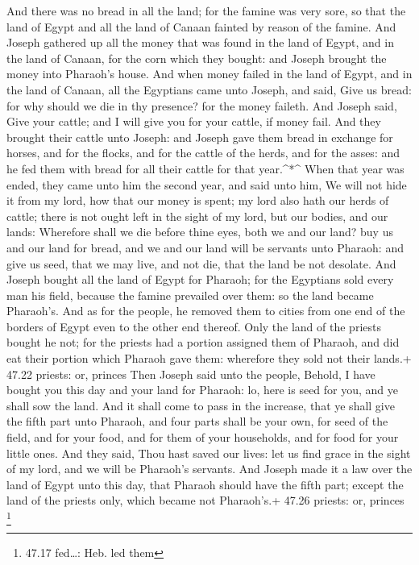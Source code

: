  And there was no bread in all the land; for the famine was
very sore, so that the land of Egypt and all the land of Canaan fainted
by reason of the famine.  And Joseph gathered up all the
money that was found in the land of Egypt, and in the land of Canaan,
for the corn which they bought: and Joseph brought the money into
Pharaoh's house.  And when money failed in the land of
Egypt, and in the land of Canaan, all the Egyptians came unto Joseph,
and said, Give us bread: for why should we die in thy presence? for the
money faileth.  And Joseph said, Give your cattle; and I
will give you for your cattle, if money fail.  And they
brought their cattle unto Joseph: and Joseph gave them bread in exchange
for horses, and for the flocks, and for the cattle of the herds, and for
the asses: and he fed them with bread for all their cattle for that
year.\^{}*\^{}  When that year was ended, they came unto
him the second year, and said unto him, We will not hide it from my
lord, how that our money is spent; my lord also hath our herds of
cattle; there is not ought left in the sight of my lord, but our bodies,
and our lands:  Wherefore shall we die before thine eyes,
both we and our land? buy us and our land for bread, and we and our land
will be servants unto Pharaoh: and give us seed, that we may live, and
not die, that the land be not desolate.  And Joseph bought
all the land of Egypt for Pharaoh; for the Egyptians sold every man his
field, because the famine prevailed over them: so the land became
Pharaoh's.  And as for the people, he removed them to
cities from one end of the borders of Egypt even to the other end
thereof.  Only the land of the priests bought he not; for
the priests had a portion assigned them of Pharaoh, and did eat their
portion which Pharaoh gave them: wherefore they sold not their lands.+
47.22 priests: or, princes  Then Joseph said unto the
people, Behold, I have bought you this day and your land for Pharaoh:
lo, here is seed for you, and ye shall sow the land.  And
it shall come to pass in the increase, that ye shall give the fifth part
unto Pharaoh, and four parts shall be your own, for seed of the field,
and for your food, and for them of your households, and for food for
your little ones.  And they said, Thou hast saved our
lives: let us find grace in the sight of my lord, and we will be
Pharaoh's servants.  And Joseph made it a law over the land
of Egypt unto this day, that Pharaoh should have the fifth part; except
the land of the priests only, which became not Pharaoh's.+ 47.26
priests: or, princes \footnote{47.17 fed\ldots: Heb. led them}

